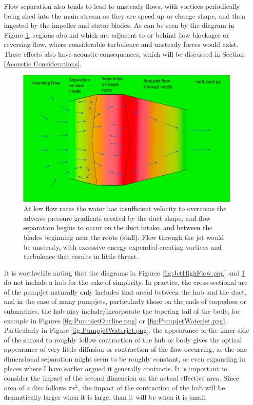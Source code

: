 \documentclass{article}\usepackage[]{graphicx}\usepackage[]{color}
\begin{document}
Flow separation also tends to lead to unsteady flows, with vortices periodically being shed into the main stream as they are speed up or change shape, and then ingested by the impeller and stator blades.  As can be seen by the diagram in Figure \ref{fig:JetLowFlow.png}, regions abound which are adjacent to or behind flow blockages or reversing flow, where considerable turbulence and unsteady forces would exist.  These effects also have acoustic consequences, which will be discussed in Section \ref{Acoustic Considerations}.

\begin{figure}
\includegraphics[width=\textwidth]{JetLowFlow.png}
\caption{At low flow rates the water has insufficient velocity to overcome the adverse pressure gradients created by the duct shape, and flow separation begins to occur on the duct intake, and between the blades beginning near the roots (stall).  Flow through the jet would be unsteady, with excessive energy expended creating vortices and turbulence that results in little thrust.}
\label{fig:JetLowFlow.png}
\end{figure}

It is worthwhile noting that the diagrams in Figures \ref{fig:JetHighFlow.png} and \ref{fig:JetLowFlow.png} do not include a hub for the sake of simplicity.  In practice, the cross-sectional are of the pumpjet naturally only includes that aread between the hub and the duct, and in the case of many pumpjets, particularly those on the ends of torpedoes or submarines, the hub may include/incorporate the tapering tail of the body, for example in Figures \ref{fig:PumpjetOutline.png} or \ref{fig:PumpjetWaterjet.png}.  Particularly in Figure \ref{fig:PumpjetWaterjet.png}, the appearance of the inner side of the shroud to roughly follow contraction of the hub or body gives the optical appearance of very little diffusion or contraction of the flow occurring, as the one dimensional separation might seem to be roughly constant, or even expanding in places where I have earlier argued it generally contracts.  It is important to consider the impact of the second dimension on the actual effective area. Since area of a disc follows $\pi r^2$, the impact of the contraction of the hub will be dramatically larger when it is large, than it will be when it is small.
\end{document}
